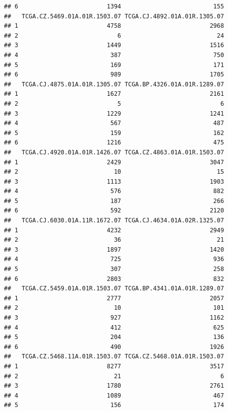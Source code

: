 \documentclass[
]{article}
\begin{document}
\begin{verbatim}
## 6                         1394                          155
##   TCGA.CZ.5469.01A.01R.1503.07 TCGA.CJ.4892.01A.01R.1305.07
## 1                         4758                         2968
## 2                            6                           24
## 3                         1449                         1516
## 4                          387                          750
## 5                          169                          171
## 6                          989                         1705
##   TCGA.CJ.4875.01A.01R.1305.07 TCGA.BP.4326.01A.01R.1289.07
## 1                         1627                         2161
## 2                            5                            6
## 3                         1229                         1241
## 4                          567                          487
## 5                          159                          162
## 6                         1216                          475
##   TCGA.CJ.4920.01A.01R.1426.07 TCGA.CZ.4863.01A.01R.1503.07
## 1                         2429                         3047
## 2                           10                           15
## 3                         1113                         1903
## 4                          576                          882
## 5                          187                          266
## 6                          592                         2120
##   TCGA.CJ.6030.01A.11R.1672.07 TCGA.CJ.4634.01A.02R.1325.07
## 1                         4232                         2949
## 2                           36                           21
## 3                         1897                         1420
## 4                          725                          936
## 5                          307                          258
## 6                         2803                          832
##   TCGA.CZ.5459.01A.01R.1503.07 TCGA.BP.4341.01A.01R.1289.07
## 1                         2777                         2057
## 2                           10                          101
## 3                          927                         1162
## 4                          412                          625
## 5                          204                          136
## 6                          490                         1926
##   TCGA.CZ.5468.11A.01R.1503.07 TCGA.CZ.5468.01A.01R.1503.07
## 1                         8277                         3517
## 2                           21                            6
## 3                         1780                         2761
## 4                         1089                          467
## 5                          156                          174

\end{verbatim}
\end{document}
